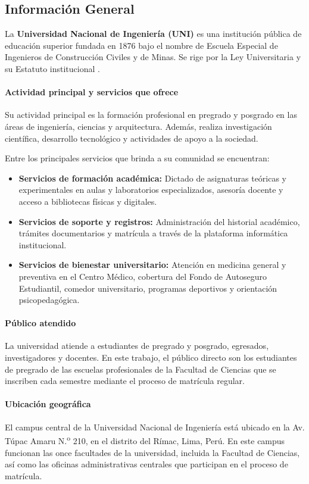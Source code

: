 \subsection{Información General}

La \textbf{Universidad Nacional de Ingeniería (UNI)} es una institución pública de educación superior fundada en 1876 bajo el nombre de Escuela Especial de Ingenieros de Construcción Civiles y de Minas. Se rige por la Ley Universitaria y su Estatuto institucional \cite{ley30220, estatuto2025}.

\paragraph{Actividad principal y servicios que ofrece}
Su actividad principal es la formación profesional en pregrado y posgrado en las áreas de ingeniería, ciencias y arquitectura. Además, realiza investigación científica, desarrollo tecnológico y actividades de apoyo a la sociedad.

Entre los principales servicios que brinda a su comunidad se encuentran:
\begin{itemize}
    \item \textbf{Servicios de formación académica:} Dictado de asignaturas teóricas y experimentales en aulas y laboratorios especializados, asesoría docente y acceso a bibliotecas físicas y digitales.
    \item \textbf{Servicios de soporte y registros:} Administración del historial académico, trámites documentarios y matrícula a través de la plataforma informática institucional.
    \item \textbf{Servicios de bienestar universitario:} Atención en medicina general y preventiva en el Centro Médico, cobertura del Fondo de Autoseguro Estudiantil, comedor universitario, programas deportivos y orientación psicopedagógica.
\end{itemize}

\paragraph{Público atendido}
La universidad atiende a estudiantes de pregrado y posgrado, egresados, investigadores y docentes. En este trabajo, el público directo son los estudiantes de pregrado de las escuelas profesionales de la Facultad de Ciencias que se inscriben cada semestre mediante el proceso de matrícula regular.

\paragraph{Ubicación geográfica}
El campus central de la Universidad Nacional de Ingeniería está ubicado en la Av. Túpac Amaru N.\textsuperscript{o} 210, en el distrito del Rímac, Lima, Perú. En este campus funcionan las once facultades de la universidad, incluida la Facultad de Ciencias, así como las oficinas administrativas centrales que participan en el proceso de matrícula.

